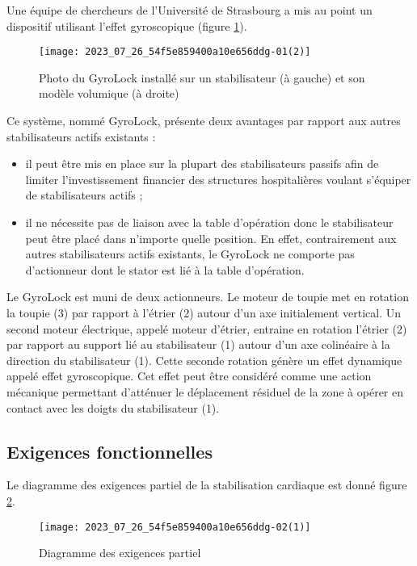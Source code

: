 Une équipe de chercheurs de l'Université de Strasbourg a mis au point un dispositif utilisant l'effet gyroscopique (figure \ref{fig:02}).

\begin{figure}[!h]
\centering
\texttt{[image: 2023\_07\_26\_54f5e859400a10e656ddg-01(2)]}
\caption{\label{fig:02}Photo du GyroLock installé sur un stabilisateur (à gauche) et son modèle volumique (à droite)}
\end{figure}


Ce système, nommé GyroLock, présente deux avantages par rapport aux autres stabilisateurs actifs existants :

\begin{itemize}
  \item il peut être mis en place sur la plupart des stabilisateurs passifs afin de limiter l'investissement financier des structures hospitalières voulant s'équiper de stabilisateurs actifs ;

  \item il ne nécessite pas de liaison avec la table d'opération donc le stabilisateur peut être placé dans n'importe quelle position. En effet, contrairement aux autres stabilisateurs actifs existants, le GyroLock ne comporte pas d'actionneur dont le stator est lié à la table d'opération.

\end{itemize}

Le GyroLock est muni de deux actionneurs. Le moteur de toupie met en rotation la toupie (3) par rapport à l'étrier (2) autour d'un axe initialement vertical. Un second moteur électrique, appelé moteur d'étrier, entraine en rotation l'étrier (2) par rapport au support lié au stabilisateur (1) autour d'un axe colinéaire à la direction du stabilisateur (1). Cette seconde rotation génère un effet dynamique appelé effet gyroscopique. Cet effet peut être considéré comme une action mécanique permettant d'atténuer le déplacement résiduel de la zone à opérer en contact avec les doigts du stabilisateur (1).

\subsection*{Exigences fonctionnelles}
Le diagramme des exigences partiel de la stabilisation cardiaque est donné figure \ref{fig:03}.


\begin{figure}[!h]
\centering
\texttt{[image: 2023\_07\_26\_54f5e859400a10e656ddg-02(1)]}
\caption{Diagramme des exigences partiel\label{fig:03}}
\end{figure}

